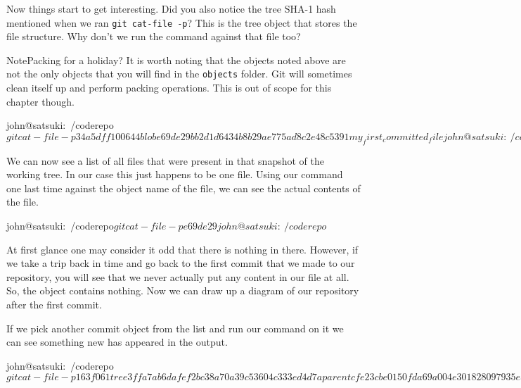 Now things start to get interesting.
Did you also notice the tree SHA-1 hash mentioned when we ran \texttt{git cat-file -p}? This is the tree object that stores the file structure.
Why don't we run the command against that file too?

\begin{callout}{Note}{Packing for a holiday?}
It is worth noting that the objects noted above are not the only objects that you will find in the \texttt{objects} folder.
Git will sometimes clean itself up and perform packing operations.
This is out of scope for this chapter though.
\end{callout}

\begin{code}
john@satsuki:~/coderepo$ git cat-file -p 34a5dff
100644 blob e69de29bb2d1d6434b8b29ae775ad8c2e48c5391
 my_first_committed_file
john@satsuki:~/coderepo$
\end{code}

We can now see a list of all files that were present in that snapshot of the working tree.
In our case this just happens to be one file.
Using our command one last time against the object name of the file, we can see the actual contents of the file.

\begin{code}
john@satsuki:~/coderepo$ git cat-file -p e69de29
john@satsuki:~/coderepo$
\end{code}

At first glance one may consider it odd that there is nothing in there.
However, if we take a trip back in time and go back to the first commit that we made to our repository, you will see that we never actually put any content in our file at all.
So, the object contains nothing.
Now we can draw up a diagram of our repository after the first commit.


If we pick another commit object from the list and run our command on it we can see something new has appeared in the output.

\begin{code}
john@satsuki:~/coderepo$ git cat-file -p 163f061
tree 3ffa7ab6dafef2bc38a70a39c53604c333ed4d7a
parent cfe23cbe0150fda69a004e301828097935ec4397
author John Haskins <john.haskins@tamagoyakiinc.koala> 1301599979 +0100
committer John Haskins <john.haskins@tamagoyakiinc.koala> 1301599979 +0100

Made a few changes to first and second files
john@satsuki:~/coderepo$
\end{code}

